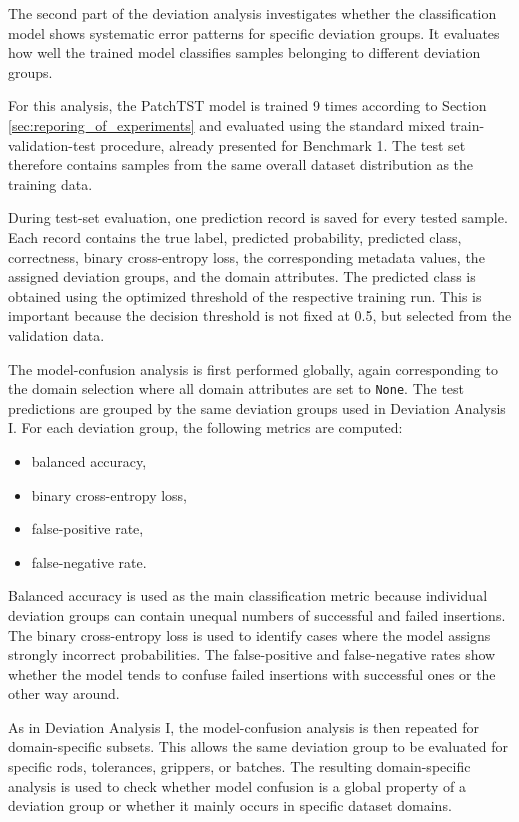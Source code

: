 The second part of the deviation analysis investigates whether the classification model shows systematic error patterns for specific deviation groups. It evaluates how well the trained model classifies samples belonging to different deviation groups.

For this analysis, the PatchTST model is trained 9 times according to Section \ref{sec:reporing_of_experiments} and evaluated using the standard mixed train-validation-test procedure, already presented for Benchmark 1. The test set therefore contains samples from the same overall dataset distribution as the training data.

During test-set evaluation, one prediction record is saved for every tested sample. Each record contains the true label, predicted probability, predicted class, correctness, binary cross-entropy loss, the corresponding metadata values, the assigned deviation groups, and the domain attributes. The predicted class is obtained using the optimized threshold of the respective training run. This is important because the decision threshold is not fixed at 0.5, but selected from the validation data.

The model-confusion analysis is first performed globally, again corresponding to the domain selection where all domain attributes are set to \texttt{None}. The test predictions are grouped by the same deviation groups used in Deviation Analysis I. For each deviation group, the following metrics are computed:

\begin{itemize}
    \item balanced accuracy,
    \item binary cross-entropy loss,
    \item false-positive rate,
    \item false-negative rate.
\end{itemize}

Balanced accuracy is used as the main classification metric because individual deviation groups can contain unequal numbers of successful and failed insertions. The binary cross-entropy loss is used to identify cases where the model assigns strongly incorrect probabilities. The false-positive and false-negative rates show whether the model tends to confuse failed insertions with successful ones or the other way around.

As in Deviation Analysis I, the model-confusion analysis is then repeated for domain-specific subsets. This allows the same deviation group to be evaluated for specific rods, tolerances, grippers, or batches. The resulting domain-specific analysis is used to check whether model confusion is a global property of a deviation group or whether it mainly occurs in specific dataset domains.


